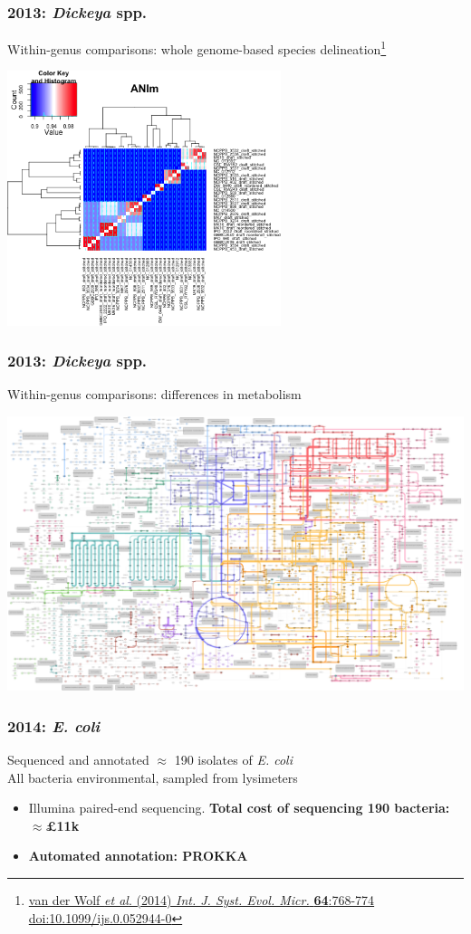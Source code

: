 \begin{frame}
  \frametitle{2013: \textit{Dickeya} spp.}
  Within-genus comparisons: whole genome-based species delineation\footnote{\tiny{\href{http://dx.doi.org/10.1099/ijs.0.052944-0}{van der Wolf \textit{et al}. (2014) \textit{Int. J. Syst. Evol. Micr.} \textbf{64}:768-774 doi:10.1099/ijs.0.052944-0}}}
  \begin{center}
    \includegraphics[width=0.6\textwidth]{images/dickeya_ani}
  \end{center}      
\end{frame}

\begin{frame}
  \frametitle{2013: \textit{Dickeya} spp.}
  Within-genus comparisons: differences in metabolism
  \begin{center}
    \includegraphics[width=1\textwidth]{images/dickeya_metabolism}
  \end{center}      
\end{frame}

\begin{frame}
  \frametitle{2014: \textit{E. coli}}
  Sequenced and annotated $\approx$ 190 isolates of \textit{E. coli} \\
  All bacteria environmental, sampled from lysimeters
  \begin{itemize}
    \item Illumina paired-end sequencing. \textbf{Total cost of sequencing 190 bacteria: $\approx$\pounds11k}
    \item \textbf{Automated annotation: PROKKA}
  \end{itemize}  
\end{frame}

